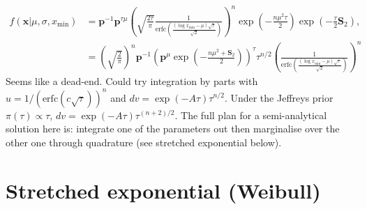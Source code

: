 \documentclass[a4paper, notitlepage, 10pt]{article}
\begin{document}
\begin{align}
  f(\boldsymbol x | \mu, \sigma, x_{\min}) &= \boldsymbol p^{-1} \boldsymbol p^{\tau\mu} \left( \sqrt{\frac{2\tau}{\pi}} \frac{1}{\text{erfc}\left( \frac{(\log x_{\min} - \mu)\sqrt{\tau} }{\sqrt{2}} \right)}\right)^n \exp\left( -\frac{n\mu^2\tau}{2} \right) \exp\left(-\frac{\tau}{2} \boldsymbol S_2 \right), \\
&=  \left(\sqrt{\frac{2}{\pi}}\right)^n\boldsymbol p^{-1} \left( \boldsymbol p^{\mu} \exp\left(-\frac{n\mu^2 + \boldsymbol S_2}{2}\right)  \right)^\tau \tau^{n/2} \left( \frac{1}{\text{erfc}\left( \frac{(\log x_{\min} - \mu)\sqrt{\tau} }{\sqrt{2}} \right)}\right)^n
\end{align}
Seems like a dead-end. 
Could try integration by parts with $u = 1/(\text{erfc}(c\sqrt{\tau}))^n$ and $dv = \exp(-A\tau) \tau^{n/2}$.
Under the Jeffreys prior $\pi(\tau) \propto \tau$, $dv = \exp(-A\tau) \tau^{(n + 2)/2}$.
The full plan for a semi-analytical solution here is: integrate one of the parameters out then marginalise over the other one through quadrature (see stretched exponential below).

\section{Stretched exponential (Weibull)}
\end{document}
